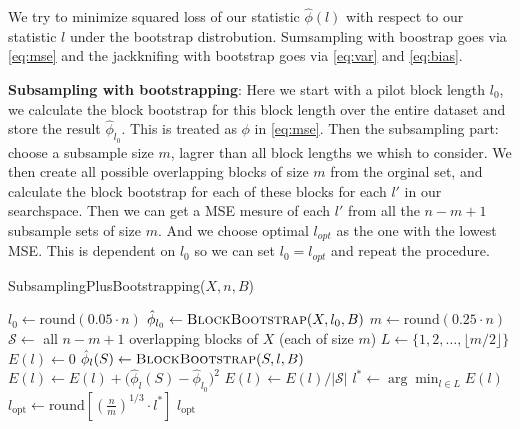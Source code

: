 \documentclass[a4paper,12pt]{article}
\theoremstyle{breaktheorem}
\theoremstyle{exerciseStyle}
\theoremstyle{solutionStyle}
\begin{document}
\begin{enumerate}
          We try to minimize squared loss of our statistic $\hat{\phi}(l)$ with respect to our statistic $l$ under the bootstrap
          distrobution. Sumsampling with boostrap goes via \eqref{eq:mse} and the jackknifing with bootstrap goes via \eqref{eq:var} and \eqref{eq:bias}.


          \textbf{Subsampling with bootstrapping}:
          Here we start with a pilot block length $l_0$, we calculate the block bootstrap for this block
          length over the entire dataset and store the result $\hat{\phi}_{l_0}$. This is treated as
          $\phi$ in \eqref{eq:mse}. Then the subsampling part: choose a subsample size $m$, lagrer than all block lengths we
          whish to consider. We then create all possible overlapping blocks of size $m$ from the orginal set,
          and calculate the block bootstrap for each of these blocks for each $l'$ in our searchspace. Then we can get a
          MSE mesure of each $l'$ from all the $n - m + 1$ subsample sets of size $m$. And we choose optimal
          $l_{opt}$ as the one with the lowest MSE.  This is dependent on $l_0$ so we can set $l_0 = l_{opt}$
          and repeat the procedure.
          \begin{algorithm}[H]
              \caption{SubsamplingPlusBootstrapping($X, n, B$)}
              \begin{algorithmic}[1]
                  \State $l_0 \gets \text{round}(0.05 \cdot n)$ 
                  \State $\hat{\phi}_{l_0} \gets \textsc{BlockBootstrap}(X, l_0, B)$
                  \State $m \gets \text{round}(0.25 \cdot n)$ 
                  \State $\mathcal{S} \gets$ all $n-m+1$ overlapping blocks of $X$ (each of size $m$)
                  \State $L \gets \{1, 2, \ldots, \lfloor m/2 \rfloor\}$ 
                  \State $E(l) \gets 0$
                  \State $\hat{\phi}_{l}(S) \gets \textsc{BlockBootstrap}(S, l, B)$
                  \State $E(l) \gets E(l) + \Big(\hat{\phi}_{l}(S)-\hat{\phi}_{l_0}\Big)^2$
                  \EndFor
                  \State $E(l) \gets E(l) / |\mathcal{S}|$ 
                  \EndFor
                  \State $l^* \gets \arg\min_{l \in L} E(l)$
                  \State $l_{\text{opt}} \gets \text{round}\left[\left(\frac{n}{m}\right)^{1/3} \cdot l^*\right]$ 
                  \State \Return $l_{\text{opt}}$
              \end{algorithmic}
          \end{algorithm}


\end{enumerate}
\end{document}
